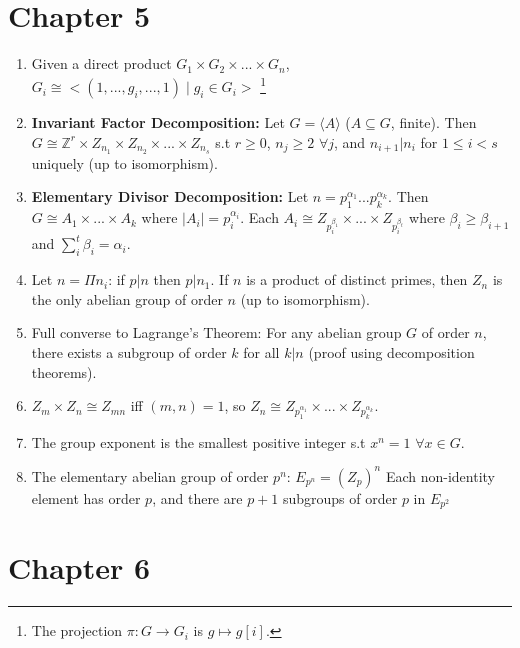 \documentclass{article}
\begin{document}
\section*{Chapter 5}

\begin{enumerate}[1.]
    \item Given a direct product $G_1 \times G_2 \times ... \times G_n$,
        $G_i \cong <(1, ..., g_i, ..., 1) \mid g_i \in G_i>$
        \footnote{The projection $\pi : G \rightarrow G_i$ is $g \mapsto
        g[i]$.}
    \item {\bf Invariant Factor Decomposition:}
        Let $G = \langle A \rangle$ ($A \subseteq G$, finite). Then $G \cong
        \mathbb{Z}^r \times Z_{n_1} \times Z_{n_2} \times ... \times
        Z_{n_s}$ s.t $r \geq 0$, $n_j \geq 2$ $\forall j$, and $n_{i+1} |
        n_i$ for $1 \leq i < s$ uniquely (up to isomorphism).
    \item {\bf Elementary Divisor Decomposition:}
        Let $n = p_1^{\alpha_1}...p_k^{\alpha_k}$. Then $G \cong A_1
        \times ... \times A_k$ where $|A_i| = p_i^{\alpha_i}$. Each $A_i
        \cong Z_{p_i^{\beta_1}} \times ... \times Z_{p_i^{\beta_t}}$ where
        $\beta_i \geq \beta_{i+1}$ and $\sum_i^t \beta_i = \alpha_i$.
    \item Let $n = \Pi n_i$: if $p | n$ then $p | n_1$. If $n$ is a product
        of distinct primes, then $Z_n$ is the only abelian group of order
        $n$ (up to isomorphism).
    \item Full converse to Lagrange's Theorem: For any abelian group $G$ of
    order $n$, there exists a subgroup of order $k$ for all $k | n$ (proof using
    decomposition theorems).
    \item $Z_m \times Z_n \cong Z_{mn}$ iff $(m, n) = 1$, so $Z_n \cong
        Z_{p_1^{\alpha_1}} \times ... \times Z_{p_k^{\alpha_k}}$.
    \item The group exponent is the smallest positive integer s.t $x^n = 1$
        $\forall x \in G$.
    \item The elementary abelian group of order $p^n$: $E_{p^n}= (Z_p)^n$
    Each non-identity element has order $p$, and there are $p+1$ subgroups of
    order $p$ in $E_{p^2}$
\end{enumerate}

\section*{Chapter 6}
\end{document}
